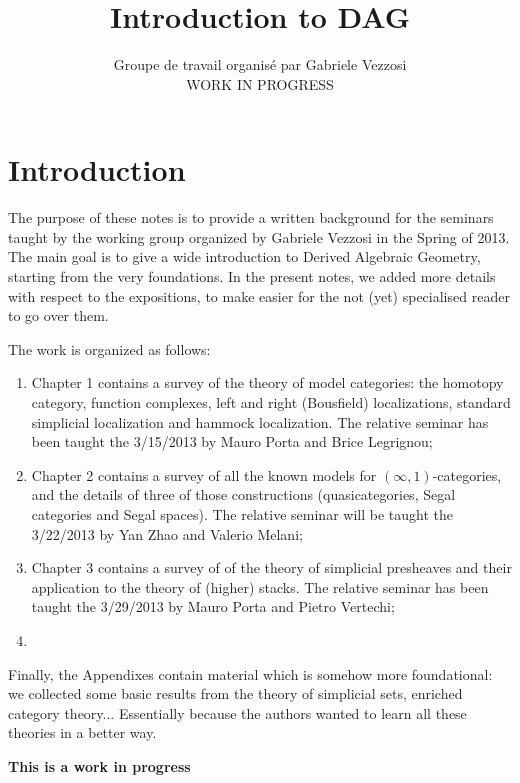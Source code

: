 \documentclass[a4paper]{book}
\title{Introduction to DAG}
\author{Groupe de travail organisé par Gabriele Vezzosi \\ WORK IN PROGRESS}
\theoremstyle{plain}
\theoremstyle{definition}
\theoremstyle{remark}
\begin{document}
\frontmatter

\maketitle

\tableofcontents

\chapter*{Introduction}

The purpose of these notes is to provide a written background for the seminars taught by the working group organized by Gabriele Vezzosi in the Spring of 2013. The main goal is to give a wide introduction to Derived Algebraic Geometry, starting from the very foundations. In the present notes, we added more details with respect to the expositions, to make easier for the not (yet) specialised reader to go over them.

The work is organized as follows:

\begin{enumerate}
\item Chapter 1 contains a survey of the theory of model categories: the homotopy category, function complexes, left and right (Bousfield) localizations, standard simplicial localization and hammock localization. The relative seminar has been taught the 3/15/2013 by Mauro Porta and Brice Legrignou;
\item Chapter 2 contains a survey of all the known models for $(\infty,1)$-categories, and the details of three of those constructions (quasicategories, Segal categories and Segal spaces). The relative seminar will be taught the 3/22/2013 by Yan Zhao and Valerio Melani;
\item Chapter 3 contains a survey of of the theory of simplicial presheaves and their application to the theory of (higher) stacks. The relative seminar has been taught the 3/29/2013 by Mauro Porta and Pietro Vertechi;
\item
\end{enumerate}

Finally, the Appendixes contain material which is somehow more foundational: we collected some basic results from the theory of simplicial sets, enriched category theory... Essentially because the authors wanted to learn all these theories in a better way.

{\bfseries This is a work in progress}

\end{document}
